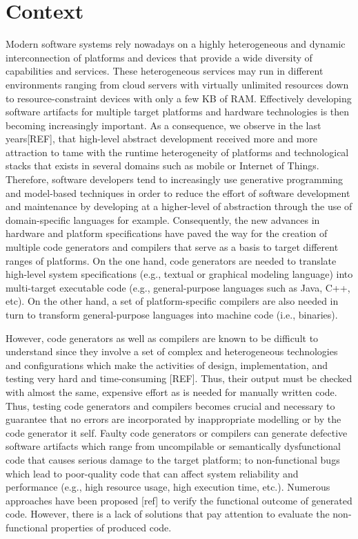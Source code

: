 
\section{Context}
Modern software systems rely nowadays on a highly heterogeneous and dynamic interconnection of platforms and devices that provide a wide diversity of capabilities and services. These heterogeneous services may run in different environments ranging from cloud servers with virtually unlimited resources down to resource-constraint devices with only a few KB of RAM. Effectively developing software artifacts for multiple target platforms and hardware technologies is then becoming increasingly important. As a consequence, we observe in the last years[REF], that high-level abstract development received more and more attraction to tame with the runtime heterogeneity of platforms and technological stacks that exists in several domains such as mobile or Internet of Things.
Therefore, software developers tend to increasingly use generative programming and model-based techniques in order to reduce the effort of software development and maintenance by developing at a higher-level of abstraction through the use of domain-specific languages for example. 
Consequently, the new advances in hardware and platform specifications have paved the way for the creation of multiple code generators and compilers that serve as a basis to target different ranges of platforms. 
On the one hand, code generators are needed to translate high-level system specifications (e.g., textual or graphical modeling language) into multi-target executable code (e.g., general-purpose languages such as Java, C++, etc).
On the other hand, a set of platform-specific compilers are also needed in turn to transform general-purpose languages into machine code (i.e., binaries). 


However, code generators as well as compilers are known to be difficult to understand since they involve a set of complex and heterogeneous technologies and configurations which make the activities of design, implementation, and testing very hard and time-consuming [REF]. Thus, their output must be checked with almost the same, expensive effort as is needed for manually written code. 
Thus, testing code generators and compilers becomes crucial and necessary to guarantee that no errors are incorporated by inappropriate modelling or by the code generator it self. 
Faulty code generators or compilers can generate defective software artifacts which range from uncompilable or semantically dysfunctional code that causes serious damage to the target platform; to non-functional bugs which lead to poor-quality code that can affect system reliability and performance (e.g., high resource usage, high execution time, etc.). 
Numerous approaches have been proposed [ref] to verify the functional outcome of generated code. However, there is a lack of solutions that pay attention to evaluate the non-functional properties of produced code.

